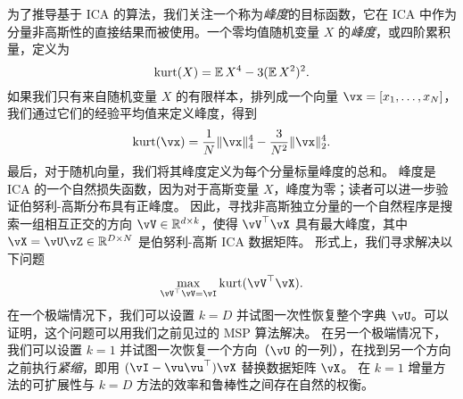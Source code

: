 \documentclass[../../book-main_zh.tex]{subfiles}
\begin{document}
为了推导基于 ICA 的算法，我们关注一个称为\textit{峰度}的目标函数，它在 ICA 中作为分量非高斯性的直接结果而被使用。一个零均值随机变量 $X$ 的\textit{峰度}，或四阶累积量，定义为
\begin{equation}\label{eq:kurtosis}
\mathop{\mathrm{kurt}}(X) = \operatorname{\mathbb{E}}{X^4} - 3 (\operatorname{\mathbb{E}}{X^2})^2.
\end{equation}
如果我们只有来自随机变量 $X$ 的有限样本，排列成一个向量 $\vx = [x_1, \dots, x_N]$，我们通过它们的经验平均值来定义峰度，得到
\begin{equation}\label{eq:kurtosis-vector}
\kurt(\vx) = \frac{1}{N} \norm{\vx}_4^4 - \frac{3}{N^2} \norm{\vx}_2^4.
\end{equation}
最后，对于随机向量，我们将其峰度定义为每个分量标量峰度的总和。
峰度是 ICA 的一个自然损失函数，因为对于高斯变量 $X$，峰度为零；读者可以进一步验证伯努利-高斯分布具有正峰度。
因此，寻找非高斯独立分量的一个自然程序是搜索一组相互正交的方向 $\vV \in \R^{d \times k}$，使得 $\vV^\top \vX$ 具有最大峰度，其中 $\vX = \vU \vZ \in \R^{D \times N}$ 是伯努利-高斯 ICA 数据矩阵。
形式上，我们寻求解决以下问题
\begin{equation}
    \max_{\vV^\top \vV = \vI} \kurt(\vV^\top \vX).
\end{equation}
在一个极端情况下，我们可以设置 $k = D$ 并试图一次性恢复整个字典 $\vU$。可以证明，这个问题可以用我们之前见过的 MSP 算法解决。
在另一个极端情况下，我们可以设置 $k=1$ 并试图一次恢复一个方向（$\vU$ 的一列），在找到另一个方向之前执行\textit{紧缩}，即用 $(\vI - \vu\vu^\top) \vX$ 替换数据矩阵 $\vX$。
在 $k=1$ 增量方法的可扩展性与 $k=D$ 方法的效率和鲁棒性之间存在自然的权衡。
\end{document}
